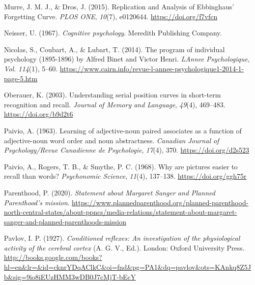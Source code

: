 \documentclass[
  oneside,
  12pt]{crumpbook}
\newlength{\cslhangindent}
\newlength{\cslentryspacingunit} %
\newenvironment{CSLReferences}[2] %
 {%
  \setlength{\parindent}{0pt}
  \ifodd #1
  \let\oldpar\par
  \def\par{\hangindent=\cslhangindent\oldpar}
  \fi
  \setlength{\parskip}{#2\cslentryspacingunit}
 }%
 {}
\begin{document}
\begin{CSLReferences}{1}{0}
\leavevmode{}%
Murre, J. M. J., \& Dros, J. (2015). Replication and {Analysis} of {Ebbinghaus}' {Forgetting Curve}. \emph{PLOS ONE}, \emph{10}(7), e0120644. \url{https://doi.org/f7vfcn}

\leavevmode{}%
Neisser, U. (1967). \emph{Cognitive psychology}. {Meredith Publishing Company}.

\leavevmode{}%
Nicolas, S., Coubart, A., \& Lubart, T. (2014). The program of individual psychology (1895-1896) by {Alfred Binet} and {Victor Henri}. \emph{LAnnee Psychologique}, \emph{Vol. 114}(1), 5--60. \url{https://www.cairn.info/revue-l-annee-psychologique1-2014-1-page-5.htm}

\leavevmode{}%
Oberauer, K. (2003). Understanding serial position curves in short-term recognition and recall. \emph{Journal of Memory and Language}, \emph{49}(4), 469--483. \url{https://doi.org/b9d2t6}

\leavevmode{}%
Paivio, A. (1963). Learning of adjective-noun paired associates as a function of adjective-noun word order and noun abstractness. \emph{Canadian Journal of Psychology/Revue Canadienne de Psychologie}, \emph{17}(4), 370. \url{https://doi.org/d2s523}

\leavevmode{}%
Paivio, A., Rogers, T. B., \& Smythe, P. C. (1968). Why are pictures easier to recall than words? \emph{Psychonomic Science}, \emph{11}(4), 137--138. \url{https://doi.org/ggh75r}

\leavevmode{}%
Parenthood, P. (2020). \emph{Statement about {Margaret Sanger} and {Planned Parenthood}'s mission}. \url{https://www.plannedparenthood.org/planned-parenthood-north-central-states/about-ppncs/media-relations/statement-about-margaret-sanger-and-planned-parenthoods-mission}

\leavevmode{}%
Pavlov, I. P. (1927). \emph{Conditioned reflexes: {An} investigation of the physiological activity of the cerebral cortex} (A. G. V., Ed.). {London: Oxford University Press}. \url{http://books.google.com/books?hl=en\&lr=\&id=cknrYDqAClkC\&oi=fnd\&pg=PA1\&dq=pavlov\&ots=KAnkq8Z5Jb\&sig=9io8iEUzHMM3wDB0J7cMjT-bEcY}


\end{CSLReferences}
\end{document}

